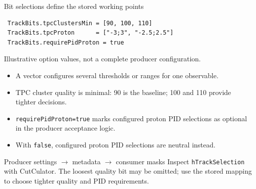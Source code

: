\begin{frame}[fragile,shrink=8]{Bit selections define the stored working points}
 \begin{lstlisting}
 TrackBits.tpcClustersMin = [90, 100, 110]
 TrackBits.tpcProton      = ["-3;3", "-2.5;2.5"]
 TrackBits.requirePidProton = true
 \end{lstlisting}
 \small Illustrative option values, not a complete producer configuration.
 \begin{itemize}
 \item A vector configures several thresholds or ranges for one observable.
 \item TPC cluster quality is minimal: 90 is the baseline; 100 and 110 provide tighter decisions.
 \item \texttt{requirePidProton=true} marks configured proton PID selections as optional in the producer acceptance logic.
 \item With \texttt{false}, configured proton PID selections are neutral instead.
 \end{itemize}
 \begin{block}{Producer settings $\to$ metadata $\to$ consumer masks}
 Inspect \texttt{hTrackSelection} with CutCulator. The loosest quality bit may be omitted; use the stored mapping to choose tighter quality and PID requirements.
 \end{block}
\end{frame}


